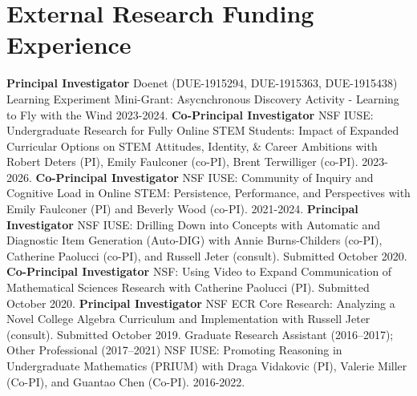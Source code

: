 \documentclass[10pt,a4paper,sans]{moderncv}
\begin{document}
\section{External Research Funding Experience}
	{\textbf{Principal Investigator}}
	{Doenet (DUE-1915294, DUE-1915363, DUE-1915438) Learning Experiment Mini-Grant: Asycnchronous Discovery Activity - Learning to Fly with the Wind}
	{2023-2024.}
	{}{}
	{\textbf{Co-Principal Investigator}}
	{NSF IUSE: Undergraduate Research for Fully Online STEM Students: Impact of Expanded Curricular Options on STEM Attitudes, Identity, \& Career Ambitions}
	{with Robert Deters (PI), Emily Faulconer (co-PI), Brent Terwilliger (co-PI). 2023-2026.}
	{}{}
	{\textbf{Co-Principal Investigator}}
	{NSF IUSE: Community of Inquiry and Cognitive Load in Online STEM: Persistence, Performance, and Perspectives}
	{with Emily Faulconer (PI) and Beverly Wood (co-PI). 2021-2024.}
	{}{}
	{\textbf{Principal Investigator}}
	{NSF IUSE: Drilling Down into Concepts with Automatic and Diagnostic Item Generation (Auto-DIG)}
	{with Annie Burns-Childers (co-PI), Catherine Paolucci (co-PI), and Russell Jeter (consult). Submitted October 2020.}
	{}{}
	{\textbf{Co-Principal Investigator}}
	{NSF: Using Video to Expand Communication of Mathematical Sciences Research}
	{with Catherine Paolucci (PI). Submitted October 2020.}
	{}{}
	{\textbf{Principal Investigator}}
	{NSF ECR Core Research: Analyzing a Novel College Algebra Curriculum and Implementation}
	{with Russell Jeter (consult). Submitted October 2019.}
	{}{}
	{Graduate Research Assistant (2016--2017); Other Professional (2017--2021)}
	{NSF IUSE: Promoting Reasoning in Undergraduate Mathematics (PRIUM)}
	{with Draga Vidakovic (PI), Valerie Miller (Co-PI), and Guantao Chen (Co-PI). 2016-2022.}
	{}{}
\end{document}
